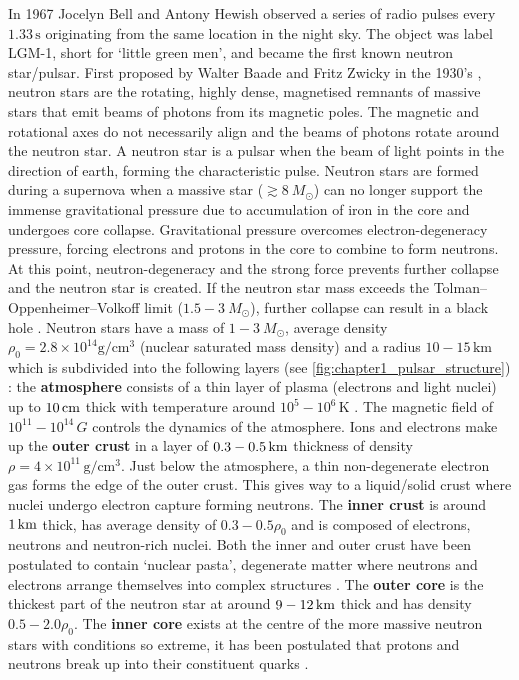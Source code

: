 In 1967 Jocelyn Bell and Antony Hewish observed a series of radio pulses every $1.33\,\si{\second}$ originating from the same location in the night sky. The object was label LGM-1, short for `little green men', and became the first known neutron star/pulsar. First proposed by Walter Baade and Fritz Zwicky in the 1930's \citep{1934PhRv...46...76B}, neutron stars are the rotating, highly dense, magnetised remnants of massive stars that emit beams of photons from its magnetic poles. The magnetic and rotational axes do not necessarily align and the beams of photons rotate around the neutron star. A neutron star is a pulsar when the beam of light points in the direction of earth, forming the characteristic pulse.
\newpar
Neutron stars are formed during a supernova when a massive star ($\gtrsim 8~M_\odot$) can no longer support the immense gravitational pressure due to accumulation of iron in the core and undergoes core collapse. Gravitational pressure overcomes electron-degeneracy pressure, forcing electrons and protons in the core to combine to form neutrons. At this point, neutron-degeneracy and the strong force prevents further collapse and the neutron star is created. If the neutron star mass exceeds the Tolman–Oppenheimer–Volkoff limit ($1.5-3~M_\odot$), further collapse can result in a black hole \citep{1996A&A...305..871B, 2015SSRv..188..187S}.
\newpar
Neutron stars have a mass of $1-3~M_\odot$, average density $\rho_0=2.8\times 10^{14}\si{\gram\per\centi\meter\cubed}$ (nuclear saturated mass density) and a radius $10-15\,\si{\kilo\meter}$ which is subdivided into the following layers (see \autoref{fig:chapter1_pulsar_structure}) \citep{2007ASSL..326.....H}: the \textbf{atmosphere} consists of a thin layer of plasma (electrons and light nuclei) up to $10\,\si{\centi\meter}$ thick with temperature around $10^5-10^6\,\si{\kelvin}$ \citep{2002nsps.conf..263Z}. The magnetic field of $10^{11}-10^{14}\,\si{G}$ controls the dynamics of the atmosphere. Ions and electrons make up the \textbf{outer crust} in a layer of $0.3-0.5\,\si{\kilo\meter}$ thickness of density $\rho=4\times 10^{11}\,\si{\gram\per\centi\meter\cubed}$. Just below the atmosphere, a thin non-degenerate electron gas forms the edge of the outer crust. This gives way to a liquid/solid crust where nuclei undergo electron capture forming neutrons. The \textbf{inner crust} is around $1\,\si{\kilo\meter}$ thick, has average density of $0.3-0.5\rho_0$ and is composed of electrons, neutrons and neutron-rich nuclei. Both the inner and outer crust have been postulated to contain `nuclear pasta', degenerate matter where neutrons and electrons arrange themselves into complex structures \citep{PhysRevC.88.065807}. The \textbf{outer core} is the thickest part of the neutron star at around $9-12\,\si{\kilo\meter}$ thick and has density $0.5-2.0\rho_0$. The \textbf{inner core} exists at the centre of the more massive neutron stars with conditions so extreme, it has been postulated that protons and neutrons break up into their constituent quarks \citep{2007ASSL..326.....H}.

